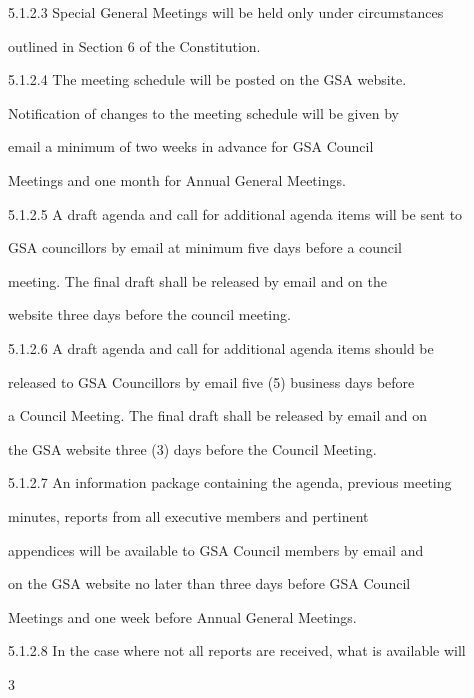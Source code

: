 5.1.2.3   Special  General  Meetings  will  be  held  only  under  circumstances  

            outlined in Section 6 of the Constitution.   

  

5.1.2.4   The   meeting   schedule   will   be   posted   on   the   GSA   website.  

            Notification  of  changes  to  the  meeting  schedule  will  be  given  by  

            email  a  minimum  of  two  weeks  in  advance  for  GSA  Council  

            Meetings and one month for Annual General Meetings.   

5.1.2.5  A draft agenda and call for additional agenda items will be sent to  

            GSA  councillors by  email  at  minimum  five  days  before  a  council  

            meeting.  The  final  draft  shall  be  released  by  email  and  on  the  

            website three days before the council meeting.  

5.1.2.6  A  draft  agenda  and  call  for  additional  agenda  items  should  be  

            released to GSA Councillors by email five (5) business days before  

            a Council Meeting. The final draft shall be released by email and on  

            the GSA website three (3) days before the Council Meeting.  

  

5.1.2.7  An  information  package  containing  the  agenda,  previous  meeting  

            minutes,       reports      from      all    executive       members         and     pertinent  

            appendices will be available to GSA Council members by email and  

            on the  GSA website no  later than  three days  before  GSA  Council  

            Meetings and one week before Annual General Meetings.   

  

5.1.2.8   In the case where not all reports are received, what is available will  



                                                         3  

